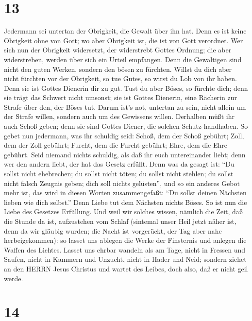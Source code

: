 \hypertarget{section-12}{%
\section{13}\label{section-12}}

 Jedermann sei untertan der Obrigkeit, die Gewalt über ihn
hat. Denn es ist keine Obrigkeit ohne von Gott; wo aber Obrigkeit ist,
die ist von Gott verordnet.  Wer sich nun der Obrigkeit
widersetzt, der widerstrebt Gottes Ordnung; die aber widerstreben,
werden über sich ein Urteil empfangen.  Denn die Gewaltigen
sind nicht den guten Werken, sondern den bösen zu fürchten. Willst du
dich aber nicht fürchten vor der Obrigkeit, so tue Gutes, so wirst du
Lob von ihr haben.  Denn sie ist Gottes Dienerin dir zu gut.
Tust du aber Böses, so fürchte dich; denn sie trägt das Schwert nicht
umsonst; sie ist Gottes Dienerin, eine Rächerin zur Strafe über den, der
Böses tut.  Darum ist's not, untertan zu sein, nicht allein
um der Strafe willen, sondern auch um des Gewissens willen. 
Derhalben müßt ihr auch Schoß geben; denn sie sind Gottes Diener, die
solchen Schutz handhaben.  So gebet nun jedermann, was ihr
schuldig seid: Schoß, dem der Schoß gebührt; Zoll, dem der Zoll gebührt;
Furcht, dem die Furcht gebührt; Ehre, dem die Ehre gebührt. 
Seid niemand nichts schuldig, als daß ihr euch untereinander liebt; denn
wer den andern liebt, der hat das Gesetz erfüllt.  Denn was
da gesagt ist: ``Du sollst nicht ehebrechen; du sollst nicht töten; du
sollst nicht stehlen; du sollst nicht falsch Zeugnis geben; dich soll
nichts gelüsten'', und so ein anderes Gebot mehr ist, das wird in diesen
Worten zusammengefaßt: ``Du sollst deinen Nächsten lieben wie dich
selbst.''  Denn Liebe tut dem Nächsten nichts Böses. So ist
nun die Liebe des Gesetzes Erfüllung.  Und weil wir solches
wissen, nämlich die Zeit, daß die Stunde da ist, aufzustehen vom Schlaf
(sintemal unser Heil jetzt näher ist, denn da wir gläubig wurden;
 die Nacht ist vorgerückt, der Tag aber nahe
herbeigekommen): so lasset uns ablegen die Werke der Finsternis und
anlegen die Waffen des Lichtes.  Lasset uns ehrbar wandeln
als am Tage, nicht in Fressen und Saufen, nicht in Kammern und Unzucht,
nicht in Hader und Neid;  sondern ziehet an den HERRN Jesus
Christus und wartet des Leibes, doch also, daß er nicht geil werde.

\hypertarget{section-13}{%
\section{14}\label{section-13}}

